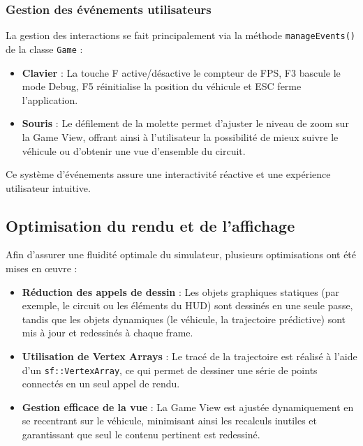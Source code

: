\subsubsection{Gestion des événements utilisateurs}\label{subsubsec:gestion-des-evenements-utilisateurs}
La gestion des interactions se fait principalement via la méthode \texttt{manageEvents()} de la classe \texttt{Game} :
\begin{itemize}
    \item \textbf{Clavier} : La touche F active/désactive le compteur de FPS, F3 bascule le mode Debug, F5 réinitialise la position du véhicule et ESC ferme l'application.
    \item \textbf{Souris} : Le défilement de la molette permet d'ajuster le niveau de zoom sur la Game View, offrant ainsi à l'utilisateur la possibilité de mieux suivre le véhicule ou d'obtenir une vue d'ensemble du circuit.
\end{itemize}
Ce système d'événements assure une interactivité réactive et une expérience utilisateur intuitive.

\subsection{Optimisation du rendu et de l'affichage}\label{subsec:optimisation-du-rendu-et-de-l-affichage}
Afin d'assurer une fluidité optimale du simulateur, plusieurs optimisations ont été mises en œuvre :
\begin{itemize}
    \item \textbf{Réduction des appels de dessin} : Les objets graphiques statiques (par exemple, le circuit ou les éléments du HUD) sont dessinés en une seule passe, tandis que les objets dynamiques (le véhicule, la trajectoire prédictive) sont mis à jour et redessinés à chaque frame.
    \item \textbf{Utilisation de Vertex Arrays} : Le tracé de la trajectoire est réalisé à l'aide d'un \texttt{sf::VertexArray}, ce qui permet de dessiner une série de points connectés en un seul appel de rendu.
    \item \textbf{Gestion efficace de la vue} : La Game View est ajustée dynamiquement en se recentrant sur le véhicule, minimisant ainsi les recalculs inutiles et garantissant que seul le contenu pertinent est redessiné.
\end{itemize}

